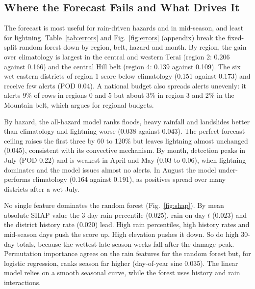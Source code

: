 \documentclass[conference]{IEEEtran}
\begin{document}
\subsection{Where the Forecast Fails and What Drives It}
The forecast is most useful for rain-driven hazards and in mid-season, and least for lightning. Table~\ref{tab:errors} and Fig.~\ref{fig:errors} (appendix) break the fixed-split random forest down by region, belt, hazard and month. By region, the gain over climatology is largest in the central and western Terai (region 2: 0.206 against 0.166) and the central Hill belt (region 4: 0.139 against 0.109). The six wet eastern districts of region 1 score below climatology (0.151 against 0.173) and receive few alerts (POD 0.04). A national budget also spreads alerts unevenly: it alerts 9\% of rows in regions 0 and 5 but about 3\% in region 3 and 2\% in the Mountain belt, which argues for regional budgets.

By hazard, the all-hazard model ranks floods, heavy rainfall and landslides better than climatology and lightning worse (0.038 against 0.043). The perfect-forecast ceiling raises the first three by 60 to 120\% but leaves lightning almost unchanged (0.045), consistent with its convective mechanism. By month, detection peaks in July (POD 0.22) and is weakest in April and May (0.03 to 0.06), when lightning dominates and the model issues almost no alerts. In August the model under-performs climatology (0.164 against 0.191), as positives spread over many districts after a wet July.

\begin{table}[t]
\caption{Random forest (set A, fixed split) on test 2024 to 2025 by region, belt and hazard, with POD at the national 5\% budget. Hazard rows score the all-hazard model against each hazard's own label.}
\label{tab:errors}
\centering
\scriptsize

\end{table}

No single feature dominates the random forest (Fig.~\ref{fig:shap}). By mean absolute SHAP value the 3-day rain percentile (0.025), rain on day $t$ (0.023) and the district history rate (0.020) lead. High rain percentiles, high history rates and mid-season days push the score up. High elevation pushes it down. So do high 30-day totals, because the wettest late-season weeks fall after the damage peak. Permutation importance agrees on the rain features for the random forest but, for logistic regression, ranks season far higher (day-of-year sine 0.035). The linear model relies on a smooth seasonal curve, while the forest uses history and rain interactions.
\end{document}
